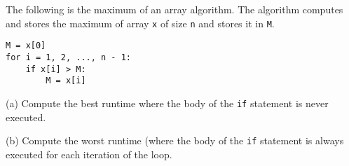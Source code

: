 The following is the maximum of an array algorithm.
The algorithm computes and stores the maximum of array \verb!x! of size
\verb!n! and stores it in \verb!M!.
\begin{Verbatim}[frame=single, fontsize=\small]
M = x[0]
for i = 1, 2, ..., n - 1:
    if x[i] > M:
        M = x[i]
\end{Verbatim}
(a) Compute the best runtime where the body of the \verb!if! statement
    is never executed.

(b) Compute the worst runtime (where the body of the \verb!if! statement
    is always executed for each iteration of the loop.
